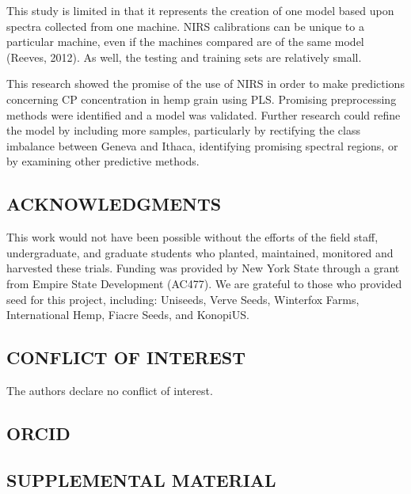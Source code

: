 \documentclass[
]{agujournal2019}
\begin{document}
This study is limited in that it represents the creation of one model
based upon spectra collected from one machine. NIRS calibrations can be
unique to a particular machine, even if the machines compared are of the
same model (Reeves, 2012). As well, the testing and training sets are
relatively small.

This research showed the promise of the use of NIRS in order to make
predictions concerning CP concentration in hemp grain using PLS.
Promising preprocessing methods were identified and a model was
validated. Further research could refine the model by including more
samples, particularly by rectifying the class imbalance between Geneva
and Ithaca, identifying promising spectral regions, or by examining
other predictive methods.

\subsection{ACKNOWLEDGMENTS}\label{acknowledgments}

This work would not have been possible without the efforts of the field
staff, undergraduate, and graduate students who planted, maintained,
monitored and harvested these trials. Funding was provided by New York
State through a grant from Empire State Development (AC477). We are
grateful to those who provided seed for this project, including:
Uniseeds, Verve Seeds, Winterfox Farms, International Hemp, Fiacre
Seeds, and KonopiUS.

\subsection{CONFLICT OF INTEREST}\label{conflict-of-interest}

The authors declare no conflict of interest.

\subsection{ORCID}\label{orcid}

\subsection{SUPPLEMENTAL MATERIAL}\label{supplemental-material}
\end{document}
